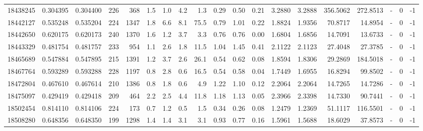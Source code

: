 \begin{tabular}{rrrrrrrrrrrrrrrrlrr}
  18438245 & 0.304395 &   0.304400 &  226 &  368 &      1.5 &      1.0 &     4.2 &      1.3 &       0.29 &        0.50 &        0.21 &  3.2880 &  3.2888 &  356.5062 &  272.8513 &             - &        0 &         -1 \\
  18442127 & 0.535248 &   0.535204 &  224 & 1347 &      1.8 &      6.6 &     8.1 &     75.5 &       0.79 &        1.01 &        0.22 &  1.8824 &  1.9356 &   70.8717 &   14.8954 &             - &        0 &         -1 \\
  18442650 & 0.620175 &   0.620173 &  240 & 1370 &      1.6 &      1.2 &     3.7 &      3.3 &       0.76 &        0.76 &        0.00 &  1.6804 &  1.6856 &   14.7091 &   13.6733 &             - &        0 &         -1 \\
  18443329 & 0.481754 &   0.481757 &  233 &  954 &      1.1 &      2.6 &     1.8 &     11.5 &       1.04 &        1.45 &        0.41 &  2.1122 &  2.1123 &   27.4048 &   27.3785 &             - &        0 &         -1 \\
  18465689 & 0.547884 &   0.547895 &  215 & 1391 &      1.2 &      3.7 &     2.6 &     26.1 &       0.54 &        0.62 &        0.08 &  1.8594 &  1.8306 &   29.2869 &  184.5018 &             - &        0 &         -1 \\
  18467764 & 0.593289 &   0.593288 &  228 & 1197 &      0.8 &      2.8 &     0.6 &     16.5 &       0.54 &        0.58 &        0.04 &  1.7449 &  1.6955 &   16.8294 &   99.8502 &             - &        0 &         -1 \\
  18472804 & 0.467610 &   0.467614 &  210 & 1386 &      0.8 &      1.8 &     0.6 &      4.9 &       1.22 &        1.10 &        0.12 &  2.2064 &  2.2064 &   14.7265 &   14.7286 &             - &        0 &         -1 \\
  18475097 & 0.429419 &   0.429418 &  209 &  464 &      2.2 &      2.5 &     4.4 &     11.8 &       1.18 &        1.13 &        0.05 &  2.3966 &  2.3398 &   14.7330 &   90.7441 &             - &        0 &         -1 \\
  18502454 & 0.814110 &   0.814106 &  224 &  173 &      0.7 &      1.2 &     0.5 &      1.5 &       0.34 &        0.26 &        0.08 &  1.2479 &  1.2369 &   51.1117 &  116.5501 &             - &        0 &         -1 \\
  18508280 & 0.648356 &   0.648350 &  199 & 1298 &      1.4 &      1.4 &     3.1 &      3.1 &       0.93 &        0.77 &        0.16 &  1.5961 &  1.5688 &   18.6029 &   37.8573 &             - &        0 &         -1 \\

\end{tabular}
